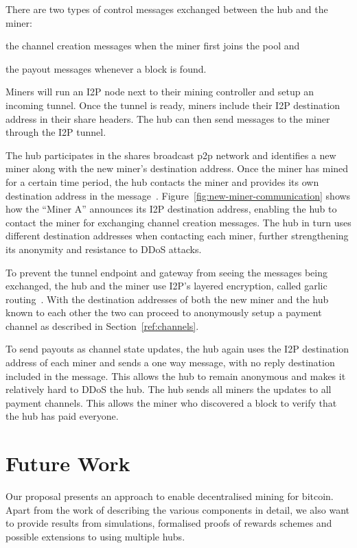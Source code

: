 \documentclass{article}
\begin{document}
There are two types of control messages exchanged between the hub and
the miner: 
\begin{enumerate*}
\item the channel creation messages when the miner first joins the
  pool and
\item the payout messages whenever a block is found.
\end{enumerate*}

Miners will run an I2P node next to their mining controller and setup
an incoming tunnel. Once the tunnel is ready, miners include their I2P
destination address in their share headers. The hub can then send
messages to the miner through the I2P tunnel.

The hub participates in the shares broadcast p2p network and
identifies a new miner along with the new miner's destination
address. Once the miner has mined for a certain time period, the hub
contacts the miner and provides its own destination address in the
message~\cite{i2p-streaming-library}. Figure~\ref{fig:new-miner-communication}
shows how the ``Miner A'' announces its I2P destination address,
enabling the hub to contact the miner for exchanging channel creation
messages. The hub in turn uses different destination addresses when
contacting each miner, further strengthening its anonymity and
resistance to DDoS attacks.

To prevent the tunnel endpoint and gateway from seeing the messages
being exchanged, the hub and the miner use I2P's layered encryption,
called garlic routing~\cite{i2p-garlic-routing}. With the destination
addresses of both the new miner and the hub known to each other the
two can proceed to anonymously setup a payment channel as described in
Section~\ref{ref:channels}.

To send payouts as channel state updates, the hub again uses the I2P
destination address of each miner and sends a one way message, with no
reply destination included in the message. This allows the hub to
remain anonymous and makes it relatively hard to DDoS the hub. The hub
sends all miners the updates to all payment channels. This allows the
miner who discovered a block to verify that the hub has paid everyone.

\section{Future Work}

Our proposal presents an approach to enable decentralised mining for
bitcoin. Apart from the work of describing the various components in
detail, we also want to provide results from simulations, formalised
proofs of rewards schemes and possible extensions to using multiple
hubs.
\end{document}
